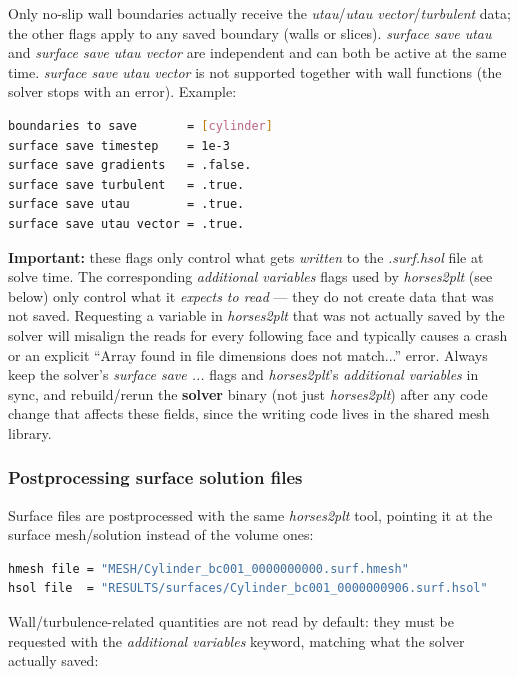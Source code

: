 \documentclass[a4paper,10pt]{report}
\begin{document}
Only no-slip wall boundaries actually receive the \textit{utau}/\textit{utau vector}/\textit{turbulent} data; the other flags apply to any saved boundary (walls or slices). \textit{surface save utau} and \textit{surface save utau vector} are independent and can both be active at the same time. \textit{surface save utau vector} is not supported together with wall functions (the solver stops with an error). Example:

\begin{lstlisting}[language=bash]
boundaries to save       = [cylinder]
surface save timestep    = 1e-3
surface save gradients   = .false.
surface save turbulent   = .true.
surface save utau        = .true.
surface save utau vector = .true.
\end{lstlisting}

\textbf{Important:} these flags only control what gets \textit{written} to the \textit{.surf.hsol} file at solve time. The corresponding \textit{additional variables} flags used by \textit{horses2plt} (see below) only control what it \textit{expects to read} --- they do not create data that was not saved. Requesting a variable in \textit{horses2plt} that was not actually saved by the solver will misalign the reads for every following face and typically causes a crash or an explicit ``Array found in file dimensions does not match...'' error. Always keep the solver's \textit{surface save ...} flags and \textit{horses2plt}'s \textit{additional variables} in sync, and rebuild/rerun the \textbf{solver} binary (not just \textit{horses2plt}) after any code change that affects these fields, since the writing code lives in the shared mesh library.

\subsubsection{Postprocessing surface solution files}

Surface files are postprocessed with the same \textit{horses2plt} tool, pointing it at the surface mesh/solution instead of the volume ones:

\begin{lstlisting}[language=bash]
hmesh file = "MESH/Cylinder_bc001_0000000000.surf.hmesh"
hsol file  = "RESULTS/surfaces/Cylinder_bc001_0000000906.surf.hsol"
\end{lstlisting}

Wall/turbulence-related quantities are not read by default: they must be requested with the \textit{additional variables} keyword, matching what the solver actually saved:
\end{document}
